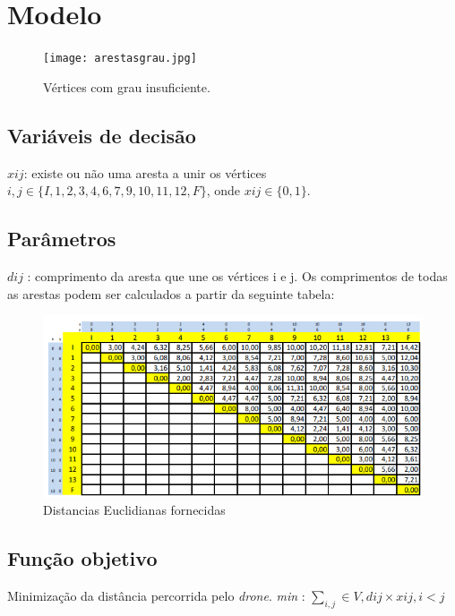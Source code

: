 \documentclass[runningheads]{llncs}
\begin{document}
    \newpage

    \section{Modelo}

    \begin{figure}[h]
        \centering
        \texttt{[image: arestasgrau.jpg]}
        \caption{Vértices com grau insuficiente.}
        \label{fig:data2}
    \end{figure}

    \subsection{Variáveis de decisão}

    $xij$: existe ou não uma aresta a unir os vértices $i,j \in \{I,1,2,3,4,6,7,9,10,11,12,F\}$, onde $xij \in \{0,1\}$.

    \newpage

    \subsection{Parâmetros}

    $dij$ : comprimento da aresta que une os vértices i e j.
    Os comprimentos de todas as arestas podem ser calculados a partir da seguinte tabela:

    \begin{figure}[h]
        \centering
        \includegraphics[scale=0.75]{distancias euclidianas.PNG}
        \caption{Distancias Euclidianas fornecidas}
        \label{fig:data3}
    \end{figure}

    \subsection{Função objetivo}
    Minimização da distância percorrida pelo \textit{drone}.
    \newline \textit{min} : $\sum_{i,j}^{} \in V,  dij  \times    xij,  i < j$
\end{document}
